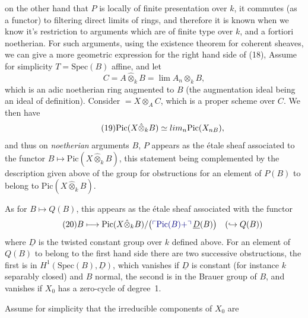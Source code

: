 \documentclass[11pt,a4paper]{article}
\begin{document}
on the other hand that $P$ is locally of finite presentation over $k$, it
commutes (as a functor) to filtering direct limits of rings, and therefore it
is known when we know it's restriction to arguments which are of finite type
over $k$, and a fortiori noetherian. For such 
arguments, using the existence theorem for coherent sheaves, we can give a
more geometric expression for the right hand side of (18), 
Assume for simplicity $T = \mathrm{Spec}(B)$ affine, and let
\[ C = A \hat{\otimes}_k B = \lim A_n \otimes_k B , \]
which is an adic noetherian ring augmented to $B$ (the augmentation ideal
being an ideal of definition). Consider \struck{\ill{}}
 $= X \otimes_A C$, which is a proper scheme over
$C$. We then have
\begin{equation*}
\tag{19} \mathrm{Pic}(X \hat{\otimes}_k B) \simeq \varprojlim_n \mathrm{Pic}(X_{nB}) ,
\end{equation*}
\struck{\ill{}} 
and thus on \emph{noetherian} arguments $B$, $P$ appears as the étale sheaf
associated to the functor
$B \mapsto \mathrm{Pic}(X \hat{\otimes}_k B)$,
 this statement being complemented by the
description given above of the group for obstructions for an element of $P(B)$
to belong to $\mathrm{Pic}(X \hat{\otimes}_k B)$.

As for $B \mapsto Q(B)$, this appears as the étale sheaf associated with the
functor
\begin{equation*}
\tag{20} B \longmapsto \mathrm{Pic}(X \hat{\otimes}_k B)/\bigl(\text{\add{$\mathrm{Pic}(B) +$}}\, \underline{D}(B)\bigr) \quad (\hookrightarrow Q(B))
\end{equation*}
where $\underline{D}$ is the twisted constant group over $k$ defined above.
For an element of $Q(B)$ to belong to the first hand side there are two
successive obstructions, the first is in $H^1(\mathrm{Spec}(B), \underline{D})$,
which vanishes  if $\underline{D}$ is constant (for instance
$k$ separably closed) and $B$ normal, the second is in the Brauer group of
$B$, and vanishes  if $X_0$ has a zero-cycle of degree~1.

Assume for simplicity that the irreducible components of $X_0$ are
\end{document}
